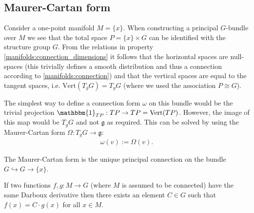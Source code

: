 \subsection{Maurer-Cartan form}


    \begin{construct}
        Consider a one-point manifold $M = \{x\}$. When constructing a principal $G$-bundle over $M$ we see that the total space $P = \{x\}\times G$ can be identified with the structure group $G$. From the relations in property \ref{manifolds:connection_dimensions} it follows that the horizontal spaces are null-spaces (this trivially defines a smooth distribution and thus a connection according to \ref{manifolds:connection}) and that the vertical spaces are equal to the tangent spaces, i.e. $\text{Vert}(T_gG) = T_gG$ (where we used the association $P\cong G$).

        The simplest way to define a connection form $\omega$ on this bundle would be the trivial projection $\mathbbm{1}_{TP}:TP\rightarrow TP=\text{Vert}(TP)$. However, the image of this map would be $T_gG$ and not $\mathfrak{g}$ as required. This can be solved by using the Maurer-Cartan form $\Omega:T_gG\rightarrow\mathfrak{g}$:
        \begin{gather}
            \omega(v) := \Omega(v).
        \end{gather}
    \end{construct}

    \begin{property}
        The Maurer-Cartan form is the unique principal connection on the bundle $G\hookrightarrow G\rightarrow \{x\}$.
    \end{property}

    \begin{property}
        If two functions $f,g:M\rightarrow G$ (where $M$ is assumed to be connected) have the same Darboux derivative then there exists an element $C\in G$ such that $f(x)=C\cdot g(x)$ for all $x\in M$.
    \end{property}

